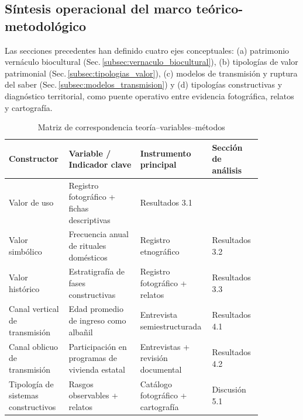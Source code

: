 \subsection{Síntesis operacional del marco teórico-metodológico}
\label{subsec:sintesis_operacional}

Las secciones precedentes han definido cuatro ejes conceptuales:
(a) patrimonio vernáculo biocultural (Sec.\,\ref{subsec:vernaculo_biocultural}),
(b) tipologías de valor patrimonial (Sec.\,\ref{subsec:tipologias_valor}),
(c) modelos de transmisión y ruptura del saber (Sec.\,\ref{subsec:modelos_transmision}) y
(d) tipologías constructivas y diagnóstico territorial, como puente operativo entre evidencia fotográfica, relatos y cartografía.

\begin{table}[ht]
	\centering
	\caption{Matriz de correspondencia teoría–variables–métodos}
	\vspace{0.25cm}
	\label{tab:matriz_operacional}
	\begin{tabular}{@{}L{0.18\linewidth}L{0.27\linewidth}L{0.22\linewidth}L{0.19\linewidth}@{}}
		\hline
		\textbf{Constructor}                           &
		\textbf{Variable / Indicador clave}            &
		\textbf{Instrumento principal}                 &
		\textbf{Sección de análisis}                     \\
		\hline
		Valor de uso \citep{riegl1903}                 &
		Registro fotográfico + fichas descriptivas     &
		Resultados 3.1                                   \\
		\hline
		Valor simbólico \citep{delatorre2002values}    &
		Frecuencia anual de rituales domésticos        &
		Registro etnográfico                           &
		Resultados 3.2                                   \\
		\hline
		Valor histórico                                &
		Estratigrafía de fases constructivas           &
		Registro fotográfico + relatos                 &
		Resultados 3.3                                   \\
		\hline
		Canal vertical de transmisión                  &
		Edad promedio de ingreso como albañil          &
		Entrevista semiestructurada                    &
		Resultados 4.1                                   \\
		\hline
		Canal oblicuo de transmisión                   &
		Participación en programas de vivienda estatal &
		Entrevistas + revisión documental              &
		Resultados 4.2                                   \\
		\hline
		Tipología de sistemas constructivos            &
		Rasgos observables + relatos                   &
		Catálogo fotográfico + cartografía             &
		Discusión 5.1                                    \\
		\hline
	\end{tabular}
\end{table}

